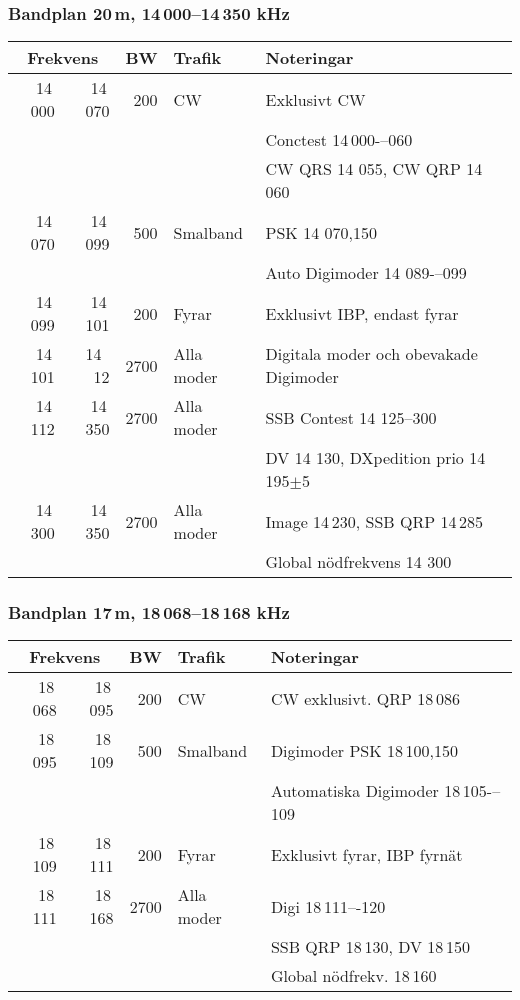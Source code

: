 \subsubsection{Bandplan 20\,m, 14\,000--14\,350 kHz}
\begin{tabular}{rrrll}
\multicolumn{2}{c}{\textbf{Frekvens}} & \textbf{BW} & \textbf{Trafik} & \textbf{Noteringar} \\ \hline
14\,000 & 14\,070 & 200  & CW         & Exklusivt CW                             \\
        &         &      &            & Conctest 14\,000-–060                    \\
        &         &      &            & CW QRS 14 055, CW QRP 14\,060            \\ \hline
14\,070 & 14\,099 & 500  & Smalband   & PSK 14 070,150                           \\
        &         &      &            & Auto Digimoder 14 089-–099               \\ \hline
14\,099 & 14\,101 & 200  & Fyrar      & Exklusivt IBP, endast fyrar              \\ \hline
14\,101 & 14 \,12 & 2700 & Alla moder & Digitala moder och obevakade Digimoder   \\ \hline
14\,112 & 14\,350 & 2700 & Alla moder & SSB Contest 14 125--300                  \\
        &         &      &            & DV 14 130, DXpedition prio 14\,195$\pm$5 \\ \hline
14\,300 & 14\,350 & 2700 & Alla moder & Image 14\,230, SSB QRP 14\,285           \\
        &         &      &            & Global nödfrekvens 14 300                \\ \hline
\end{tabular}

\subsubsection{Bandplan 17\,m, 18\,068--18\,168 kHz}
\begin{tabular}{rrrll}
\multicolumn{2}{c}{\textbf{Frekvens}} & \textbf{BW} & \textbf{Trafik} & \textbf{Noteringar} \\ \hline

18\,068 & 18\,095 & 200  & CW         & CW exklusivt. QRP 18\,086             \\ \hline
18\,095 & 18\,109 & 500  & Smalband   & Digimoder PSK 18\,100,150             \\
        &         &      &            & Automatiska Digimoder 18\,105-–109 \\ \hline
18\,109 & 18\,111 & 200  & Fyrar      & Exklusivt fyrar, IBP fyrnät           \\ \hline
18\,111 & 18\,168 & 2700 & Alla moder & Digi 18\,111–-120                   \\
        &         &      &            & SSB QRP 18\,130, DV 18\,150           \\
        &         &      &            & Global nödfrekv. 18\,160              \\ \hline
\end{tabular}

